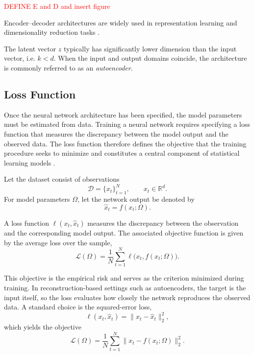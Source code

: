 \textcolor{red}{DEFINE E and D and insert figure}

Encoder--decoder architectures are widely used in representation learning and dimensionality reduction tasks \citep{Goodfellow2016}.

The latent vector $z$ typically has significantly lower dimension than the input vector, i.e. $k < d$. When the input and output domains coincide, the architecture is commonly referred to as an \emph{autoencoder}.

\subsection{Loss Function}

Once the neural network architecture has been specified, the model parameters must be estimated from data. Training a neural network requires specifying a loss function that measures the discrepancy between the model output and the observed data. The loss function therefore defines the objective that the training procedure seeks to minimize and constitutes a central component of statistical learning models \citep{Bishop2006}.

Let the dataset consist of observations
\[
\mathcal{D}=\{x_t\}_{t=1}^N,
\qquad x_t \in \mathbb{R}^d.
\]
For model parameters \(\Omega\), let the network output be denoted by
\[
\hat{x}_t = f(x_t;\Omega).
\]

A loss function \(\ell(x_t,\hat{x}_t)\) measures the discrepancy between the observation and the corresponding model output. The associated objective function is given by the average loss over the sample,
\begin{equation}
\mathcal{L}(\Omega)
=
\frac{1}{N}\sum_{t=1}^N \ell\big(x_t,f(x_t;\Omega)\big).
\end{equation}

This objective is the empirical risk and serves as the criterion minimized during training. In reconstruction-based settings such as autoencoders, the target is the input itself, so the loss evaluates how closely the network reproduces the observed data. A standard choice is the squared-error loss,
\begin{equation}
\ell(x_t,\hat{x}_t)
=
\|x_t-\hat{x}_t\|_2^2,
\end{equation}
which yields the objective
\begin{equation}
\mathcal{L}(\Omega)
=
\frac{1}{N}\sum_{t=1}^N \|x_t-f(x_t;\Omega)\|_2^2.
\end{equation}

